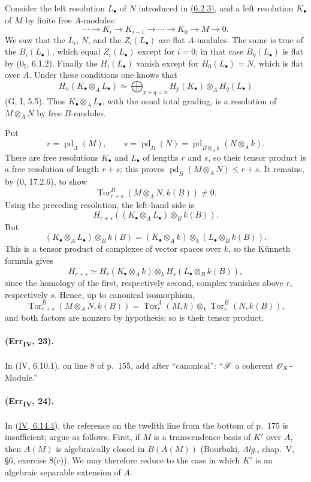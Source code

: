 Consider the left resolution $L_\bullet$ of $N$ introduced in {\hyperref[IV.6.2.3]{(6.2.3)}},
and a left resolution $K_\bullet$ of $M$ by finite free $A$-modules:
\[
 \cdots\longrightarrow K_i\longrightarrow K_{i-1}\longrightarrow
 \cdots\longrightarrow K_0\longrightarrow M\longrightarrow0.
\]
We saw that the $L_i$, $N$, and the $Z_i(L_\bullet)$ are flat
$A$-modules.  The same is true of the $B_i(L_\bullet)$, which equal
$Z_i(L_\bullet)$ except for $i=0$; in that case $B_0(L_\bullet)$ is flat
by ($0_{\mathrm I}$, 6.1.2).  Finally the $H_i(L_\bullet)$ vanish except
for $H_0(L_\bullet)=N$, which is flat over $A$.  Under these conditions
one knows that
\[
 H_n(K_\bullet\otimes_AL_\bullet)\simeq
 \bigoplus_{p+q=n}H_p(K_\bullet)\otimes_AH_q(L_\bullet)
\]
(G, I, 5.5).  Thus $K_\bullet\otimes_AL_\bullet$, with the usual total
grading, is a resolution of $M\otimes_AN$ by free $B$-modules.

Put
\[
 r=\operatorname{pd}_A(M),\qquad
 s=\operatorname{pd}_B(N)=
   \operatorname{pd}_{B\otimes_Ak}(N\otimes_Ak).
\]
There are free resolutions $K_\bullet$ and $L_\bullet$ of lengths $r$
and $s$, so their tensor product is a free resolution of length $r+s$;
this proves
$\operatorname{pd}_B(M\otimes_AN)\leq r+s$.  It remains, by
($0$, 17.2.6), to show
\[
 \operatorname{Tor}^{B}_{r+s}(M\otimes_AN,k(B))\neq0.
\]
Using the preceding resolution, the left-hand side is
\[
 H_{r+s}((K_\bullet\otimes_AL_\bullet)\otimes_Bk(B)).
\]
But
\[
 (K_\bullet\otimes_AL_\bullet)\otimes_Bk(B)
 = (K_\bullet\otimes_Ak)\otimes_k
   (L_\bullet\otimes_Bk(B)).
\]
This is a tensor product of complexes of vector spaces over $k$, so the
K\"unneth formula gives
\[
 H_{r+s}\simeq H_r(K_\bullet\otimes_Ak)\otimes_k
 H_s(L_\bullet\otimes_Bk(B)),
\]
since the homology of the first, respectively second, complex vanishes
above $r$, respectively $s$.  Hence, up to canonical isomorphism,
\[
 \operatorname{Tor}^{B}_{r+s}(M\otimes_AN,k(B))=
 \operatorname{Tor}^{A}_{r}(M,k)\otimes_k
 \operatorname{Tor}^{B}_{s}(N,k(B)),
\]
and both factors are nonzero by hypothesis; so is their tensor product.

\paragraph{(Err\textsubscript{IV}, 23).}
In (IV, 6.10.1), on line 8 of p.~155, add after ``canonical'':
``$\mathscr{F}$ a coherent $\mathscr{O}_X$-Module.''

\paragraph{(Err\textsubscript{IV}, 24).}
In ({\hyperref[IV.6.14.4]{IV, 6.14.4}}), the reference on the twelfth line from the bottom of
p.~175 is insufficient; argue as follows.  First, if $M$ is a
transcendence basis of $K'$ over $A$, then $A(M)$ is algebraically closed
in $B(A(M))$ (Bourbaki, \emph{Alg.}, chap.~V, \S6, exercise 8(c)).  We
may therefore reduce to the case in which $K'$ is an algebraic separable
extension of $A$.

